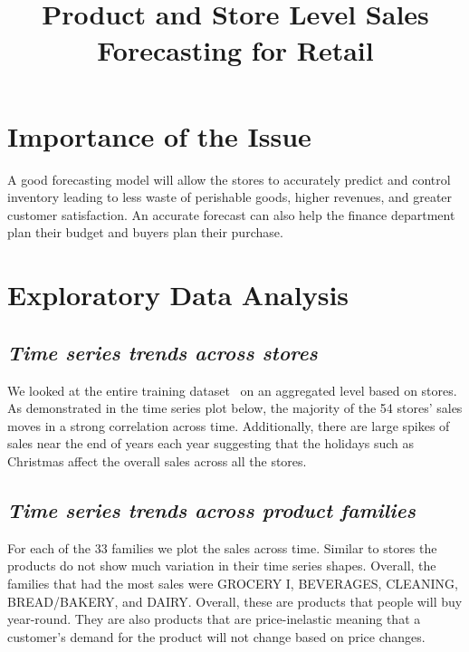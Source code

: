 \documentclass[12pt,a4paper]{cibb}
\title{\large $\ $\\ \bf Product and Store Level Sales Forecasting for Retail}
\begin{document}
\thispagestyle{myheadings}
\pagestyle{myheadings}



\section{\bf Importance of the Issue}
\label{sec:IMPORTANCE-OF-ISSUE}
A good forecasting model will allow the stores to accurately predict and control inventory leading to less waste of perishable goods, higher revenues, and greater customer satisfaction. An accurate forecast can also help the finance department plan their budget and buyers plan their purchase.


\section{\bf Exploratory Data Analysis}
\label{sec:EDA}

\subsection{\bf \it Time series trends across stores}
We looked at the entire training dataset~\cite{kaggledataset}  on an aggregated level based on stores. As demonstrated in the time series plot below, the majority of the 54 stores’ sales moves in a strong correlation across time. Additionally, there are large spikes of sales near the end of years each year suggesting that the holidays such as Christmas affect the overall sales across all the stores. 

\subsection{\bf \it Time series trends across product families}
For each of the 33 families we plot the sales across time. Similar to stores the products do not show much variation in their time series shapes. Overall, the families that had the most sales were GROCERY I, BEVERAGES,  CLEANING, BREAD/BAKERY, and DAIRY. Overall, these are products that people will buy year-round. They are also products that are price-inelastic meaning that a customer’s demand for the product will not change based on price changes.
\end{document}
